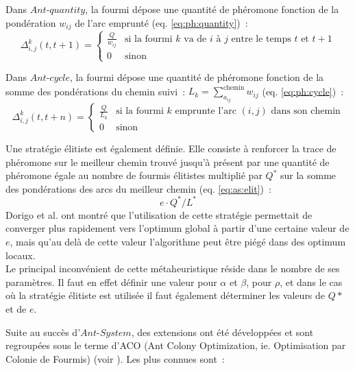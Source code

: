 Dans $Ant$-$quantity$, la fourmi dépose une quantité de phéromone fonction de la pondération $w_{ij}$ de l'arc emprunté (eq. \ref{eq:ph:quantity})~:
\begin{equation}
 \Delta_{i,j}^k(t,t+1)=
  \begin{cases}
    \frac{Q}{w_{ij}} & \text{si la fourmi } k \text{ va de } i \text{ à } j \text{ entre le temps } t \text{ et } t+1\\
    0 & \text{sinon}
  \end{cases}
  \label{eq:ph:quantity}
\end{equation}

Dans $Ant$-$cycle$, la fourmi dépose une quantité de phéromone fonction de la somme des pondérations du chemin suivi~: $L_k=\sum\limits_{a_{ij}}^{\text{chemin}} w_{ij}$ (eq. \ref{eq:ph:cycle})~:
\begin{equation}
 \Delta_{i,j}^k(t,t+n)=
  \begin{cases}
    \frac{Q}{L_k} & \text{si la fourmi } k \text{ emprunte l'arc } (i,j) \text{ dans son chemin}\\
    0 & \text{sinon}
  \end{cases}
  \label{eq:ph:cycle}
\end{equation}

Une stratégie élitiste est également définie. Elle consiste à renforcer la trace de phéromone sur le meilleur chemin trouvé jusqu'à présent par une quantité de phéromone égale au nombre de fourmis élitistes multiplié par $Q^*$ sur la somme des pondérations des arcs du meilleur chemin (eq. \ref{eq:as:elit})~: 
\begin{equation}
 e \cdot Q^* / L^*
 \label{eq:as:elit}
\end{equation}
Dorigo et al. ont montré que l'utilisation de cette stratégie permettait de converger plus rapidement vers l'optimum global à partir d'une certaine valeur de $e$, mais qu'au delà de cette valeur l'algorithme peut être piégé dans des optimum locaux.\\

Le principal inconvénient de cette métaheuristique réside dans le nombre de ses paramètres. Il faut en effet définir une valeur pour $\alpha$ et $\beta$, pour $\rho$, et dans le cas où la stratégie élitiste est utilisée il faut également déterminer les valeurs de $Q*$ et de $e$.

Suite au succès d'$Ant$-$System$, des extensions ont été développées et sont regroupées sous le terme d'ACO (Ant Colony Optimization, ie. Optimisation par Colonie de Fourmis) (voir \cite{Geurts1998}). Les plus connues sont~:

